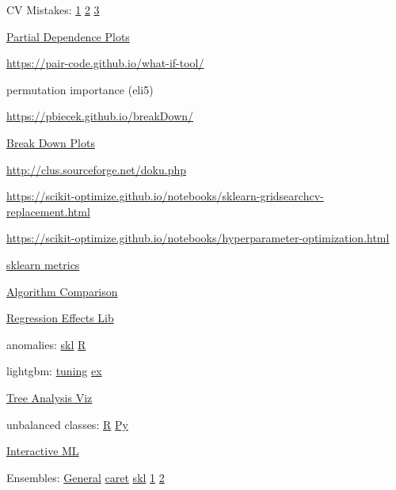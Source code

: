 \documentclass[]{book}
\begin{document}
CV Mistakes:
\href{http://betatim.github.io/posts/cross-validation-gone-wrong/}{1}
\textbar{}
\href{http://www.alfredo.motta.name/cross-validation-done-wrong/}{2}
\textbar{} \href{http://robjhyndman.com/hyndsight/crossvalidation/}{3}

\href{https://cran.r-project.org/web/packages/pdp/pdp.pdf}{Partial
Dependence Plots}

\url{https://pair-code.github.io/what-if-tool/}

permutation importance (eli5)

\url{https://pbiecek.github.io/breakDown/}

\href{https://cran.r-project.org/web/packages/breakDown/index.html}{Break
Down Plots}

\url{http://clus.sourceforge.net/doku.php}

\url{https://scikit-optimize.github.io/notebooks/sklearn-gridsearchcv-replacement.html}

\url{https://scikit-optimize.github.io/notebooks/hyperparameter-optimization.html}

\href{http://scikit-learn.org/stable/modules/model_evaluation.html\#function-for-prediction-error-metrics}{sklearn
metrics}

\href{https://docs.google.com/spreadsheets/d/16i47Wmjpj8k-mFRk-NnXXU5tmSQz8h37YxluDV8Zy9U/edit\#gid=0}{Algorithm
Comparison}

\href{https://www.rdocumentation.org/packages/yhat/versions/2.0-0}{Regression
Effects Lib}

anomalies:
\href{http://scikit-learn.org/stable/modules/outlier_detection.html}{skl}
\textbar{} \href{https://business-science.github.io/anomalize/}{R}

lightgbm:
\href{https://medium.com/@pushkarmandot/https-medium-com-pushkarmandot-what-is-lightgbm-how-to-implement-it-how-to-fine-tune-the-parameters-60347819b7fc}{tuning}
\textbar{}
\href{https://www.kaggle.com/ezietsman/simple-python-lightgbm-example}{ex}

\href{http://etetoolkit.org/}{Tree Analysis Viz}

unbalanced classes:
\href{https://cran.r-project.org/web/packages/imbalance/index.html}{R}
\textbar{}
\href{http://contrib.scikit-learn.org/imbalanced-learn/stable/}{Py}

\href{http://www.creativeai.net/posts/eivW6BvrrpyPf282d/interactive-machine-learning-an-overview-in-5-videos}{Interactive
ML}

Ensembles: \href{http://mlwave.com/kaggle-ensembling-guide/}{General}
\textbar{} \href{http://amunategui.github.io/blending-models/}{caret}
\textbar{}
\href{https://www.toptal.com/machine-learning/ensemble-methods-machine-learning}{skl}
\textbar{}
\href{http://blog.kaggle.com/2016/12/27/a-kagglers-guide-to-model-stacking-in-practice/}{1}
\textbar{}
\href{http://blog.kaggle.com/2017/06/15/stacking-made-easy-an-introduction-to-stacknet-by-competitions-grandmaster-marios-michailidis-kazanova/}{2}
\end{document}
